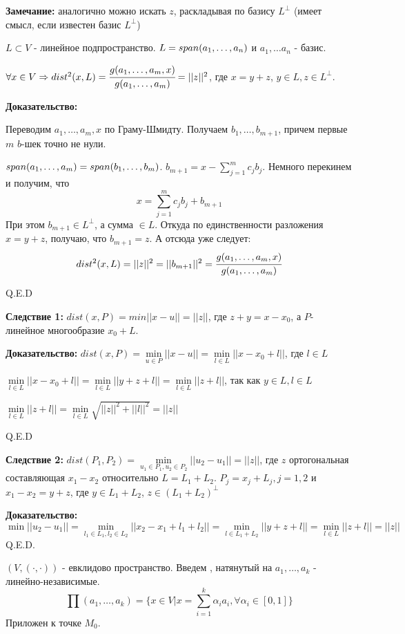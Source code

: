\textbf{Замечание:} аналогично можно искать $z$, раскладывая по базису $L^\perp$ (имеет смысл, если известен базис $L^\perp$)



$L \subset V $ - линейное подпространство. $L= span (a_1,\ldots,a_n)$ и $a_1,\ldots a_n$ - базис.

$\forall x \in V \Rightarrow dist^2(x,L) = \cfrac{g(a_1,\ldots, a_m,x)}{g(a_1,\ldots, a_m)} =||z||^2$, где $x = y+z$, $y\in L, z\in L^\perp$.

\textbf{Доказательство:}

Переводим $a_1,\ldots,a_m,x$ по Граму-Шмидту. Получаем $b_1,\ldots , b_{m+1}$, причем первые $m$ $b$-шек точно не нули. 

$span (a_1,\ldots , a_m) = span (b_1,\ldots, b_m)$. $b_{m+1} = x -\sum\limits_{j=1}^m c_j b_j$. Немного перекинем и получим, что
$$x =\sum\limits_{j=1}^m c_j b_j + b_{m+1} $$
При этом $b_{m+1}\in L^\perp$, а сумма $\in L$. Откуда по единственности разложения $x= y+z$, получаю, что $b_{m+1}=z$. А отсюда уже следует:
$$dist^2(x, L) = ||z||^2 = ||b_{m+1}||^2 = \cfrac{g(a_1,\ldots, a_m,x)}{g(a_1,\ldots, a_m)}$$

\hfill Q.E.D

\textbf{Следствие 1:} $dist(x, P ) = min ||x-u|| = ||z ||$, где $z+y= x-x_0$, а $P$- линейное многообразие $x_0+L$.

\textbf{Доказательство:}
$dist(x,P) = \min\limits_{u\in P}||x-u|| = \min\limits_{l\in L} ||x-x_0 + l||$, где $l \in L$

$\min\limits_{l\in L} ||x-x_0 + l||= \min\limits_{l\in L}||y+z + l|| = \min\limits_{l\in L}||z+l||$, так как $y \in L, l \in L$

$\min\limits_{l\in L}||z+l|| = \min\limits_{l \in L}\sqrt{||z||^2 + ||l||^2}= ||z||$

\hfill Q.E.D

\textbf{Следствие 2:} $dist (P_1, P_2) = \min\limits_{u_1\in P_1,u_2\in P_2}||u_2-u_1|| = ||z||$, где $z$ ортогональная составляющая $x_1-x_2$ относительно $L = L_1+L_2$. $P_j = x_j + L_j, j=1,2$ и $x_1-x_2 = y + z$, где $y\in L_1 + L_2$, $z \in (L_1 +L_2)^\perp$

\textbf{Доказательство:}
$$\min ||u_2-u_1|| = \min\limits_{l_1\in L_1,l_2\in L_2} ||x_2-x_1 + l_1 + l_2|| = \min\limits_{l\in L_1 +L_2}||y+z+l|| = \min\limits_{l\in L}||z+l|| =||z||$$
\hfill Q.E.D.

 $(V, (\cdot, \cdot))$ - евклидово пространство. Введем , натянутый на $a_1,\ldots,a_k$ - линейно-независимые.
$$\prod (a_1,\ldots, a_k) = \{x\in V | x = \sum\limits_{i=1}^k \alpha_i a_i, \forall \alpha_i \in [0,1]\}$$
Приложен к точке $M_0$.

